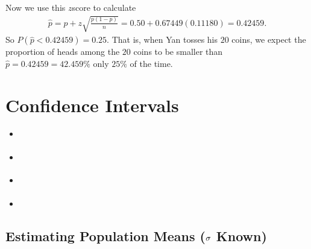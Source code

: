 \documentclass[letterpaper,10pt,english]{jupyterBook}
\begin{document}
\sphinxAtStartPar
Now we use this \(z\)\sphinxhyphen{}score to calculate
\begin{equation*}
\begin{split} \hat{p} = p + z\sqrt{\frac{p(1-p)}{n}} = 0.50 + 0.67449(0.11180) = 0.42459. \end{split}
\end{equation*}
\sphinxAtStartPar
So \(P(\hat{p} < 0.42459) = 0.25\). That is, when Yan tosses his \(20\) coins, we expect the proportion of heads among the \(20\) coins to be smaller than \(\hat{p} = 0.42459 = 42.459\%\) only \(25\%\) of the time.

\sphinxstepscope


\chapter{Confidence Intervals}
\label{\detokenize{Ch5 Confidence Intervals/5.0 Confidence Intervals:confidence-intervals}}\label{\detokenize{Ch5 Confidence Intervals/5.0 Confidence Intervals::doc}}\begin{itemize}
\item {} 
\sphinxAtStartPar
{\hyperref[\detokenize{Ch5 Confidence Intervals/5.1 Estimating Population Means (Sigma Known)::doc}]{}}

\item {} 
\sphinxAtStartPar
{\hyperref[\detokenize{Ch5 Confidence Intervals/5.2 Estimating Population Proportions::doc}]{}}

\item {} 
\sphinxAtStartPar
{\hyperref[\detokenize{Ch5 Confidence Intervals/5.3 Student's t-Distribution::doc}]{}}

\item {} 
\sphinxAtStartPar
{\hyperref[\detokenize{Ch5 Confidence Intervals/5.4 Estimating Population Means (Sigma Unknown)::doc}]{}}

\end{itemize}

\sphinxstepscope


\section{Estimating Population Means (\protect\(\sigma\protect\) Known)}
\label{\detokenize{Ch5 Confidence Intervals/5.1 Estimating Population Means (Sigma Known):estimating-population-means-sigma-known}}\label{\detokenize{Ch5 Confidence Intervals/5.1 Estimating Population Means (Sigma Known)::doc}}
\end{document}
